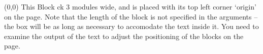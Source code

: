 


	\setlength{\TPHorizModule}{1\textwidth} %
	\setlength{\TPVertModule}{\TPHorizModule}
	\textblockorigin{50mm}{200mm}
	\setlength{\parindent}{0pt} %

	\begin{textblock}{0.2}(0,0)
		This Block ck 3 modules wide, and is placed with its top left corner
		 ‘origin’ on the page. Note that the length of the block is not
		specified in the arguments -- the box will be as long as necessary to
		accomodate the text inside it.
		You need to examine the output of the
		text to adjust the positioning of the blocks on the page.
	\end{textblock}
